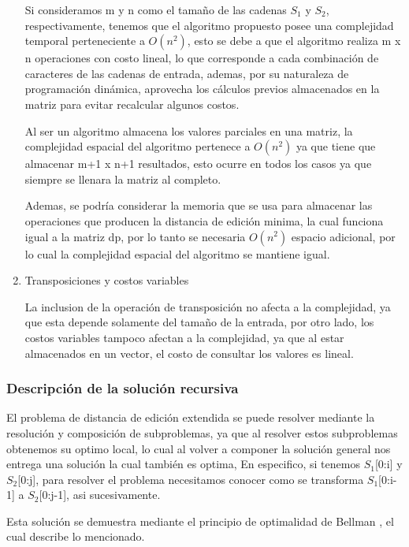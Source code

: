 \begin{enumerate}[1)]
    Si consideramos m y n como el tamaño de las cadenas $S_1$ y $S_2$, 
    respectivamente, tenemos que
    el algoritmo propuesto posee una complejidad temporal 
    perteneciente a $O\left(n^{2}\right)$, esto
    se debe a que el algoritmo realiza m x n operaciones con costo lineal, lo que corresponde
    a cada combinación de caracteres de las cadenas de entrada, ademas, por su naturaleza
    de programación dinámica, aprovecha los cálculos previos almacenados en la matriz para 
    evitar recalcular algunos costos.
    
    Al ser un algoritmo almacena los valores parciales en una matriz, 
    la complejidad espacial del algoritmo pertenece a $O\left(n^{2}\right)$ 
    ya que tiene que almacenar m+1 x n+1 resultados, esto ocurre en todos los casos
    ya que siempre se llenara la matriz al completo.
    
    Ademas, se podría considerar la memoria que se usa para almacenar las operaciones
    que producen la distancia de edición minima, la cual funciona igual a la matriz dp,
    por lo tanto se necesaria $O\left(n^{2}\right)$ espacio adicional, por lo cual
    la complejidad espacial del algoritmo se mantiene igual.


    \item Transposiciones y costos variables
    
    La inclusion de la operación de transposición no afecta
    a la complejidad, ya que esta depende solamente del tamaño de la entrada,
    por otro lado, los costos variables tampoco afectan a la complejidad, ya que
    al estar almacenados en un vector, el costo de consultar los valores es lineal.

\end{enumerate}

\subsubsection{Descripción de la solución recursiva}

El problema de distancia de edición extendida se puede resolver
mediante la resolución y composición
de subproblemas, ya que al resolver estos subproblemas obtenemos
su optimo local, lo cual al volver a componer la solución general
nos entrega una solución la cual también es optima, En especifico,
si tenemos $S_1$[0:i] y $S_2$[0:j], para resolver el problema
necesitamos conocer como se transforma $S_1$[0:i-1] a $S_2$[0:j-1], asi sucesivamente.

Esta solución se demuestra mediante el principio de optimalidad de Bellman \cite{optimizaciondp}, el
cual describe lo mencionado.

